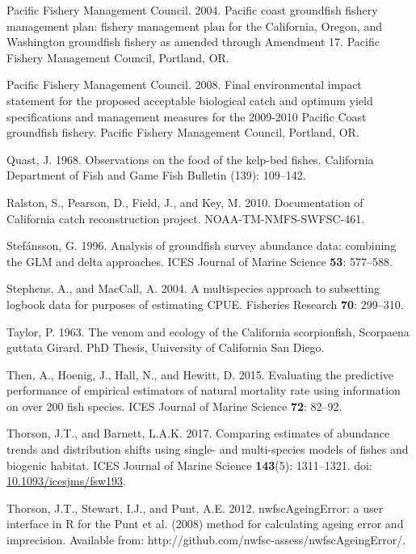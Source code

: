 \documentclass[12pt,]{article}
\begin{document}
\hypertarget{ref-PFMC2004}{}
Pacific Fishery Management Council. 2004. Pacific coast groundfish
fishery management plan: fishery management plan for the California,
Oregon, and Washington groundfish fishery as amended through Amendment
17. Pacific Fishery Management Council, Portland, OR.

\hypertarget{ref-PFMC2008}{}
Pacific Fishery Management Council. 2008. Final environmental impact
statement for the proposed acceptable biological catch and optimum yield
specifications and management measures for the 2009-2010 Pacific Coast
groundfish fishery. Pacific Fishery Management Council, Portland, OR.

\hypertarget{ref-Quast1968}{}
Quast, J. 1968. Observations on the food of the kelp-bed fishes.
California Department of Fish and Game Fish Bulletin (139): 109--142.

\hypertarget{ref-Ralston2010}{}
Ralston, S., Pearson, D., Field, J., and Key, M. 2010. Documentation of
California catch reconstruction project. NOAA-TM-NMFS-SWFSC-461.

\hypertarget{ref-Stefansson1996}{}
Stefánsson, G. 1996. Analysis of groundfish survey abundance data:
combining the GLM and delta approaches. ICES Journal of Marine Science
\textbf{53}: 577--588.

\hypertarget{ref-Stephens2004}{}
Stephens, A., and MacCall, A. 2004. A multispecies approach to
subsetting logbook data for purposes of estimating CPUE. Fisheries
Research \textbf{70}: 299--310.

\hypertarget{ref-Taylor1963}{}
Taylor, P. 1963. The venom and ecology of the California scorpionfish,
Scorpaena guttata Girard. PhD Thesis, University of California San
Diego.

\hypertarget{ref-Then2015}{}
Then, A., Hoenig, J., Hall, N., and Hewitt, D. 2015. Evaluating the
predictive performance of empirical estimators of natural mortality rate
using information on over 200 fish species. ICES Journal of Marine
Science \textbf{72}: 82--92.

\hypertarget{ref-Thorson2017}{}
Thorson, J.T., and Barnett, L.A.K. 2017. Comparing estimates of
abundance trends and distribution shifts using single- and multi-species
models of fishes and biogenic habitat. ICES Journal of Marine Science
\textbf{143}(5): 1311--1321. doi:
\href{https://doi.org/10.1093/icesjms/fsw193}{10.1093/icesjms/fsw193}.

\hypertarget{ref-Thorson2012}{}
Thorson, J.T., Stewart, I.J., and Punt, A.E. 2012. nwfscAgeingError: a
user interface in R for the Punt et al. (2008) method for calculating
ageing error and imprecision. Available from:
http://github.com/nwfsc-assess/nwfscAgeingError/.
\end{document}
